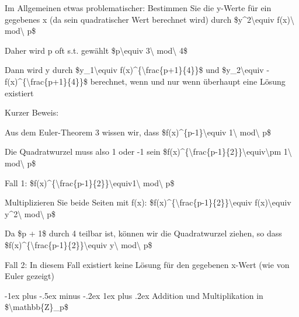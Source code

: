 \documentclass[a4paper]{article}
\makeatletter
\renewcommand{\subsubsection}{\@startsection{subsubsection}{3}{0mm}%
 {-1ex plus -.5ex minus -.2ex}%
 {1ex plus .2ex}%
 {\normalfont\small\bfseries}}
\makeatother
\begin{document}
\begin{multicols}{3}
      \begin{itemize*}
            \item Im Allgemeinen etwas problematischer: Bestimmen Sie die y-Werte für
            ein gegebenes x (da sein quadratischer Wert berechnet wird) durch
            \$y\^{}2\textbackslash equiv f(x)\textbackslash{} mod\textbackslash{}
            p\$
            \item Daher wird p oft s.t. gewählt \$p\textbackslash equiv
            3\textbackslash{} mod\textbackslash{} 4\$
            \item Dann wird y durch \$y\_1\textbackslash equiv
            f(x)\^{}\{\textbackslash frac\{p+1\}\{4\}\}\$ und
            \$y\_2\textbackslash equiv
            -f(x)\^{}\{\textbackslash frac\{p+1\}\{4\}\}\$ berechnet, wenn und nur
            wenn überhaupt eine Lösung existiert
            \item Kurzer Beweis:
            \begin{itemize*}
                  \item Aus dem Euler-Theorem 3 wissen wir, dass \$f(x)\^{}\{p-1\}\textbackslash equiv 1\textbackslash{} mod\textbackslash{} p\$
                  \item Die Quadratwurzel muss also 1 oder -1 sein \$f(x)\^{}\{\textbackslash frac\{p-1\}\{2\}\}\textbackslash equiv\textbackslash pm 1\textbackslash{} mod\textbackslash{} p\$
            \end{itemize*}
            \item Fall 1:
            \$f(x)\^{}\{\textbackslash frac\{p-1\}\{2\}\}\textbackslash equiv1\textbackslash{}
            mod\textbackslash{} p\$
            \begin{itemize*}
                  \item Multiplizieren Sie beide Seiten mit f(x): \$f(x)\^{}\{\textbackslash frac\{p-1\}\{2\}\}\textbackslash equiv f(x)\textbackslash equiv y\^{}2\textbackslash{} mod\textbackslash{} p\$
                  \item Da \$p + 1\$ durch 4 teilbar ist, können wir die Quadratwurzel ziehen, so dass \$f(x)\^{}\{\textbackslash frac\{p-1\}\{2\}\}\textbackslash equiv y\textbackslash{} mod\textbackslash{} p\$
            \end{itemize*}
            \item Fall 2: In diesem Fall existiert keine Lösung für den gegebenen x-Wert
            (wie von Euler gezeigt)
      \end{itemize*}


      \subsubsection{Addition und Multiplikation in
            \$\textbackslash mathbb\{Z\}\_p\$}


\end{multicols}
\end{document}

